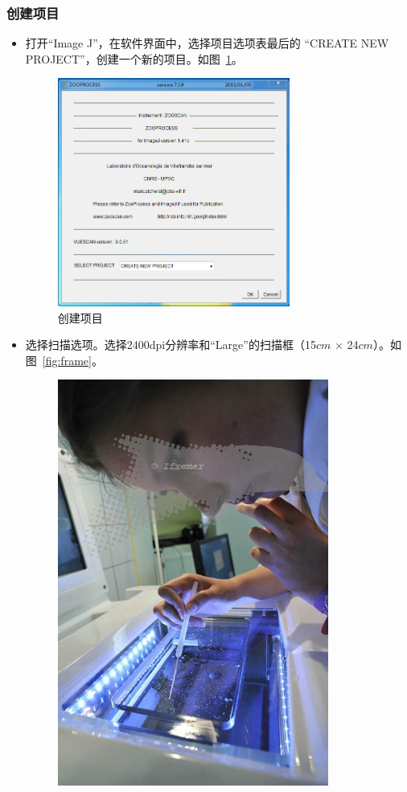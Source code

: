 \documentclass[12pt]{article}
\begin{document}
\subsubsection{创建项目}
\begin{itemize}
\item 打开``Image J''，在软件界面中，选择项目选项表最后的 ``CREATE NEW PROJECT''，创建一个新的项目。如图~\ref{fig:create}。
    \begin{figure}[!ht]
    \centering
    \includegraphics[width=3in]{create}
    \caption{创建项目}
    \label{fig:create}
    \end{figure}
\item 选择扫描选项。选择2400dpi分辨率和``Large''的扫描框（15$cm$ $\times$ 24$cm$）。如图~\ref{fig:frame}。
    \begin{figure}[!ht]
    \centering
    \includegraphics[width=3.5in]{frame}

\end{figure}
\end{itemize}
\end{document}
